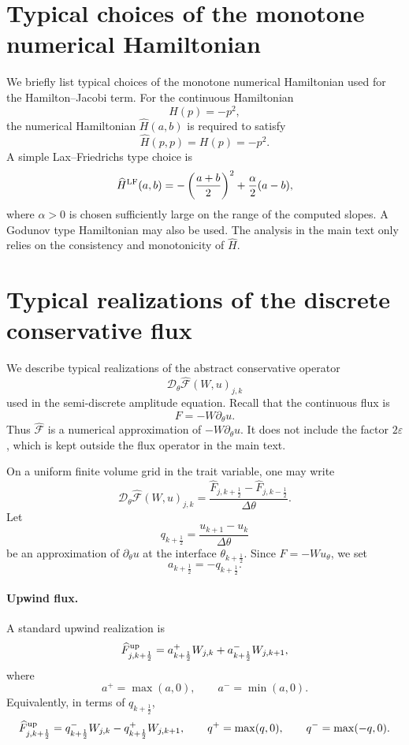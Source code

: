 \documentclass[11pt, dina4, amsfont12]{article}
\begin{document}
\appendix
\appendix

\section{Typical choices of the monotone numerical Hamiltonian}
\label{append:HJ}

We briefly list typical choices of the monotone numerical Hamiltonian used
for the Hamilton--Jacobi term. For the continuous Hamiltonian
\[
H(p)=-p^2,
\]
the numerical Hamiltonian \(\widehat H(a,b)\) is required to satisfy
\[
\widehat H(p,p)=H(p)=-p^2 .
\]
A simple Lax--Friedrichs type choice is
\[
\widehat H^{\rm LF}(a,b)
=
-\left(\frac{a+b}{2}\right)^2
+\frac{\alpha}{2}(a-b),
\]
where \(\alpha>0\) is chosen sufficiently large on the range of the
computed slopes. A Godunov type Hamiltonian may also be used. The analysis
in the main text only relies on the consistency and monotonicity of
\(\widehat H\).

\section{Typical realizations of the discrete conservative flux}
\label{append:flux}

We describe typical realizations of the abstract conservative operator
\[
\mathcal D_\theta\widehat{\mathcal F}(W,u)_{j,k}
\]
used in the semi-discrete amplitude equation. Recall that the continuous
flux is
\[
F=-W\partial_\theta u .
\]
Thus \(\widehat{\mathcal F}\) is a numerical approximation of
\(-W\partial_\theta u\). It does not include the factor \(2\varepsilon\),
which is kept outside the flux operator in the main text.

On a uniform finite volume grid in the trait variable, one may write
\[
\mathcal D_\theta\widehat{\mathcal F}(W,u)_{j,k}
=
\frac{
\widehat F_{j,k+\frac12}
-
\widehat F_{j,k-\frac12}
}{\Delta\theta}.
\]
Let
\[
q_{k+\frac12}
=
\frac{u_{k+1}-u_k}{\Delta\theta}
\]
be an approximation of \(\partial_\theta u\) at the interface
\(\theta_{k+\frac12}\). Since \(F=-Wu_\theta\), we set
\[
a_{k+\frac12}=-q_{k+\frac12}.
\]

\paragraph{Upwind flux.}
A standard upwind realization is
\[
\widehat F_{j,k+\frac12}^{\rm up}
=
a_{k+\frac12}^+ W_{j,k}
+
a_{k+\frac12}^- W_{j,k+1},
\]
where
\[
a^+=\max(a,0),
\qquad
a^-=\min(a,0).
\]
Equivalently, in terms of \(q_{k+\frac12}\),
\[
\widehat F_{j,k+\frac12}^{\rm up}
=
q_{k+\frac12}^- W_{j,k}
-
q_{k+\frac12}^+ W_{j,k+1},
\qquad
q^+=\max(q,0),
\qquad
q^-=\max(-q,0).
\]
\end{document}
